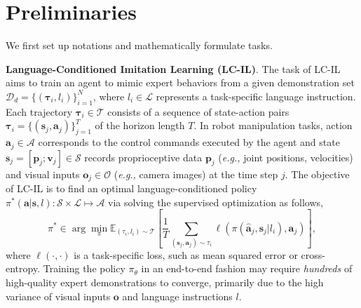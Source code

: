 \section{Preliminaries}
\label{sec:preliminaries}
We first set up notations and mathematically formulate tasks.

\noindent\textbf{Language-Conditioned Imitation Learning (LC-IL)}. The task of LC-IL aims to train an agent to mimic expert behaviors from a given demonstration set $\mathcal{D}_d = \{(\mathbf{\tau}_i,l_i)\}_{i=1}^N$, where $l_i \in \mathcal{L} $ represents a task-specific language instruction. Each trajectory $\mathbf{\tau}_i\in\mathcal{T}$ consists of a sequence of state-action pairs $\mathbf{\tau}_i = \{(\mathbf{s}_j, \mathbf{a}_j)\}_{j=1}^T$ of the horizon length $T$. In robot manipulation tasks, action $\mathbf{a}_j\in\mathcal{A}$ corresponds to the control commands executed by the agent and state $\mathbf{s}_j = [\mathbf{p}_j; \mathbf{v}_j] \in\mathcal{S}$ records proprioceptive data $\mathbf{p}_j$ (\textit{e.g.,} joint positions, velocities) and visual inputs $\mathbf{o}_j\in\mathcal{O}$ (\textit{e.g.,} camera images) at the time step $j$. The objective of LC-IL is to find an optimal language-conditioned policy $\pi^*(\mathbf{a}|\mathbf{s},l): \mathcal{S}\times\mathcal{L}\mapsto\mathcal{A}$ via solving the supervised optimization as follows,
\begin{equation}\nonumber
    \pi^* \in \arg\min_{\pi} \mathbb{E}_{(\tau_i, l_i)\sim \mathcal{T}} \left[ \frac{1}{T} \sum_{(\mathbf{s}_j, \mathbf{a}_j) \sim \tau_i} \ell(\pi(\hat{\mathbf{a}}_j, \mathbf{s}_j|l_i),  \mathbf{a}_j)\right],
\end{equation}
where \(\ell(\cdot, \cdot)\) is a task-specific loss, such as mean squared error or cross-entropy. Training the policy \(\pi_\theta\) in an end-to-end fashion may require \textit{hundreds} of high-quality expert demonstrations to converge, primarily due to the high variance of visual inputs $\mathbf{o}$ and language instructions $l$.

